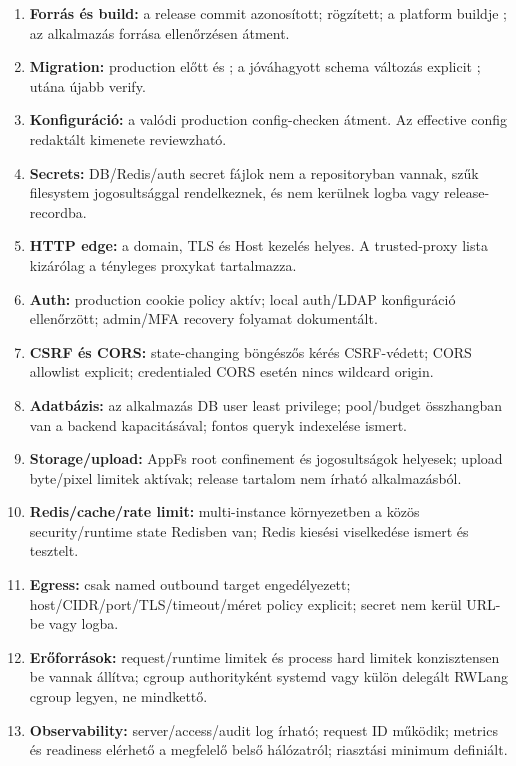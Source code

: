 \begin{enumerate}
  \item \textbf{Forrás és build:} a release commit azonosított;  rögzített; a platform buildje ; az alkalmazás forrása  ellenőrzésen átment.
  \item \textbf{Migration:} production előtt  és ; a jóváhagyott schema változás explicit ; utána újabb verify.
  \item \textbf{Konfiguráció:} a valódi production  config-checken átment. Az effective config redaktált kimenete reviewzható.
  \item \textbf{Secrets:} DB/Redis/auth secret fájlok nem a repositoryban vannak, szűk filesystem jogosultsággal rendelkeznek, és nem kerülnek logba vagy release-recordba.
  \item \textbf{HTTP edge:} a domain, TLS és Host kezelés helyes. A trusted-proxy lista kizárólag a tényleges proxykat tartalmazza.
  \item \textbf{Auth:} production cookie policy aktív; local auth/LDAP konfiguráció ellenőrzött; admin/MFA recovery folyamat dokumentált.
  \item \textbf{CSRF és CORS:} state-changing böngészős kérés CSRF-védett; CORS allowlist explicit; credentialed CORS esetén nincs wildcard origin.
  \item \textbf{Adatbázis:} az alkalmazás DB user least privilege; pool/budget összhangban van a backend kapacitásával; fontos queryk indexelése ismert.
  \item \textbf{Storage/upload:} AppFs root confinement és jogosultságok helyesek; upload byte/pixel limitek aktívak; release tartalom nem írható alkalmazásból.
  \item \textbf{Redis/cache/rate limit:} multi-instance környezetben a közös security/runtime state Redisben van; Redis kiesési viselkedése ismert és tesztelt.
  \item \textbf{Egress:} csak named outbound target engedélyezett; host/CIDR/port/TLS/timeout/méret policy explicit; secret nem kerül URL-be vagy logba.
  \item \textbf{Erőforrások:} request/runtime limitek és process hard limitek konzisztensen be vannak állítva; cgroup authorityként systemd vagy külön delegált RWLang cgroup legyen, ne mindkettő.
  \item \textbf{Observability:} server/access/audit log írható; request ID működik; metrics és readiness elérhető a megfelelő belső hálózatról; riasztási minimum definiált.

\end{enumerate}
